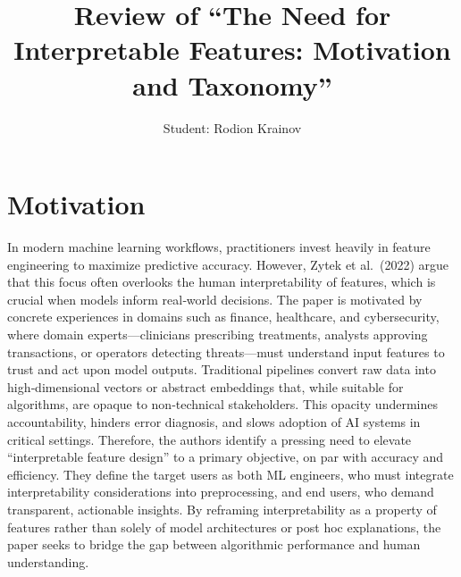 \documentclass[12pt]{article}
\title{Review of “The Need for Interpretable Features: Motivation and Taxonomy”}
\author{Student: Rodion Krainov}
\date{}
\begin{document}
\maketitle

\section{Motivation}
In modern machine learning workflows, practitioners invest heavily in feature engineering to maximize predictive accuracy. However, Zytek et al.\ (2022) argue that this focus often overlooks the human interpretability of features, which is crucial when models inform real‐world decisions. The paper is motivated by concrete experiences in domains such as finance, healthcare, and cybersecurity, where domain experts—clinicians prescribing treatments, analysts approving transactions, or operators detecting threats—must understand input features to trust and act upon model outputs. Traditional pipelines convert raw data into high‑dimensional vectors or abstract embeddings that, while suitable for algorithms, are opaque to non‑technical stakeholders. This opacity undermines accountability, hinders error diagnosis, and slows adoption of AI systems in critical settings. Therefore, the authors identify a pressing need to elevate “interpretable feature design” to a primary objective, on par with accuracy and efficiency. They define the target users as both ML engineers, who must integrate interpretability considerations into preprocessing, and end users, who demand transparent, actionable insights. By reframing interpretability as a property of features rather than solely of model architectures or post hoc explanations, the paper seeks to bridge the gap between algorithmic performance and human understanding.
\end{document}
